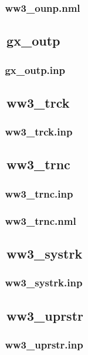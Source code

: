 \subsubsection{~ww3\_ounp.nml} \label{sec:config172}
\vsssub
\vssub

\vssub
\subsection{~gx\_outp}
\vsssub
\subsubsection{~gx\_outp.inp} \label{sec:config181}
\vsssub
\vssub

\vssub
\subsection{~ww3\_trck}
\vsssub
\subsubsection{~ww3\_trck.inp} \label{sec:config191}
\vsssub
\vssub

\vssub
\subsection{~ww3\_trnc}
\vsssub
\subsubsection{~ww3\_trnc.inp} \label{sec:config201}
\vsssub
\vsssub
\subsubsection{~ww3\_trnc.nml} \label{sec:config202}
\vsssub
\vssub

\vssub
\subsection{~ww3\_systrk}
\vsssub
\subsubsection{~ww3\_systrk.inp} \label{sec:config211}
\vsssub
\vssub

\vssub
\subsection{~ww3\_uprstr}
\vsssub
\subsubsection{~ww3\_uprstr.inp} \label{sec:config221}
\vsssub
\vssub

\bpage \pagestyle{empty}
